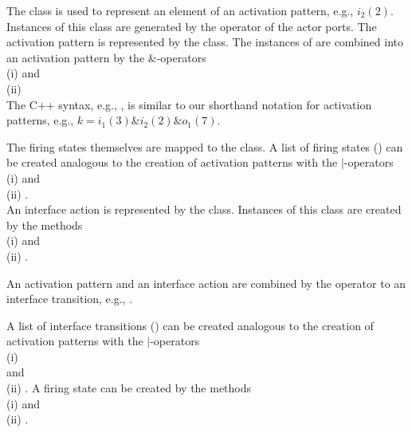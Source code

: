 The  class is used to represent an element of an
activation pattern, e.g., $i_2(2)$.
Instances of this class are generated by the 
operator of the actor ports. The activation pattern is represented by the
 class. The instances of 
are combined into an activation pattern by the $\&$-operators\\
(i)  and\\
(ii) \\
The C++ syntax, e.g., ,
is similar to our shorthand notation for activation patterns, e.g., $k = i_1(3) \& i_2(2) \& o_1(7)$.

The firing states themselves are mapped to the  class.
A list of firing states () can be created analogous
to the creation of activation patterns with the $|$-operators\\
(i)  and\\
(ii) .\\
An interface action is represented by the  class.
Instances of this class are created by the methods\\
(i)  and\\
(ii) .

An activation pattern and an interface action are combined by the
operator to an interface transition,
e.g., .

A list of interface transitions () can be created analogous
to the creation of activation patterns with the $|$-operators\\
(i)   \\
      and\\
(ii) .
A firing state can be created by the methods\\
(i)  and\\
(ii) .\\


